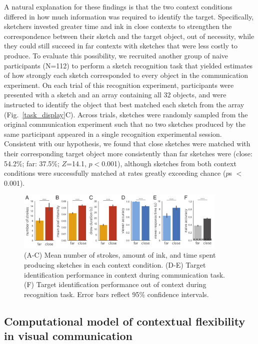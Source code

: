 \documentclass{svjour3}
\begin{document}
A natural explanation for these findings is that the two context conditions differed in how much information was required to identify the target. 
Specifically, sketchers invested greater time and ink in close contexts to strengthen the correspondence between their sketch and the target object, out of necessity, while they could still succeed in far contexts with sketches that were less costly to produce.
To evaluate this possibility, we recruited another group of naive participants (N=112) to perform a sketch recognition task that yielded estimates of how strongly each sketch corresponded to every object in the communication experiment. 
On each trial of this recognition experiment, participants were presented with a sketch and an array containing all 32 objects, and were instructed to identify the object that best matched each sketch from the array (Fig.~\ref{task_display}C). 
Across trials, sketches were randomly sampled from the original communication experiment such that no two sketches produced by the same participant appeared in a single recognition experimental session. 
Consistent with our hypothesis, we found that close sketches were matched with their corresponding target object more consistently than far sketches were (close: 54.2\%; far: 37.5\%; $Z$=14.1, $p <$0.001), although sketches from both context conditions were successfully matched at rates greatly exceeding chance ($p$s $<$ 0.001).


\begin{figure}[htbp]
\centering
\includegraphics[width=0.9\textwidth]{3_behavioral_performance.pdf}
\caption{(A-C) Mean number of strokes, amount of ink, and time spent producing sketches in each context condition. (D-E) Target identification performance in context during communication task. (F) Target identification performance out of context during recognition task. Error bars reflect 95\% confidence intervals.}
\label{task_performance}
\end{figure}

\subsection*{Computational model of contextual flexibility in visual communication}
\end{document}
